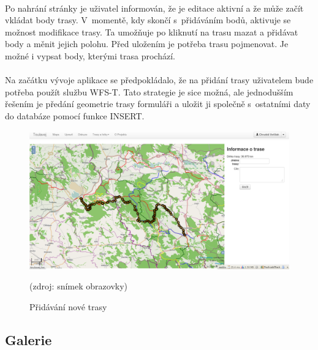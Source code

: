 \documentclass[11pt,a4paper,titlepage,oneside]{book}
\begin{document}
			\paragraph{} Po nahrání stránky je uživatel informován, že je editace aktivní a že může začít vkládat body trasy. V~momentě, kdy skončí s~přidáváním bodů, aktivuje se možnost modifikace trasy. Ta umožňuje po kliknutí na trasu mazat a přidávat body a měnit jejich polohu. Před uložením je potřeba trasu pojmenovat. Je možné i vypsat body, kterými trasa prochází. 
			\paragraph{} Na začátku vývoje aplikace se předpokládalo, že na přidání trasy uživatelem bude potřeba použít službu \ac{WFS-T}. Tato strategie je sice možná, ale jednodušším řešením je předání geometrie trasy  formuláři a uložit ji společně s~ostatními daty  do databáze pomocí funkce INSERT.
		\begin{figure}[!h]
			\begin{center}
				\includegraphics[width=12cm]{obrazky/toulavej/trackAdd.png}
				\caption{Přidávání nové trasy}
				\label{fig:tAdd}
				(zdroj: snímek obrazovky)
			\end{center}
		\end{figure}

		\subsection{Galerie}
\end{document}
